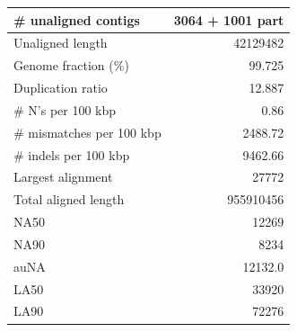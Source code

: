 \documentclass[12pt,a4paper]{article}
\begin{document}
\begin{table}[ht]
\begin{center}
\begin{tabular}{|l*{1}{|r}|}
\# unaligned contigs & 3064 + 1001 part \\ \hline
Unaligned length & 42129482 \\ \hline
Genome fraction (\%) & 99.725 \\ \hline
Duplication ratio & 12.887 \\ \hline
\# N's per 100 kbp & 0.86 \\ \hline
\# mismatches per 100 kbp & 2488.72 \\ \hline
\# indels per 100 kbp & 9462.66 \\ \hline
Largest alignment & 27772 \\ \hline
Total aligned length & 955910456 \\ \hline
NA50 & 12269 \\ \hline
NA90 & 8234 \\ \hline
auNA & 12132.0 \\ \hline
LA50 & 33920 \\ \hline
LA90 & 72276 \\ \hline
\end{tabular}
\end{center}
\end{table}
\end{document}
